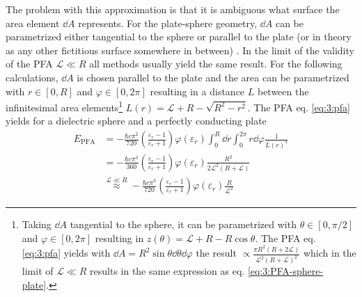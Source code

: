 The problem with this approximation is that it is ambiguous what surface the area element $\dd A$ represents. For the plate-sphere geometry, $\dd A$ can be parametrized either tangential to the sphere or parallel to the plate (or in theory as any other fictitious surface somewhere in between) \cite{Bulgac_2006}.
In the limit of the validity of the PFA $\mathscr{L} \ll R$ all methods usually yield the same result.
For the following calculations, $\dd A$ is chosen parallel to the plate and the area can be parametrized with $r\in [0, R]$ and $\varphi \in [0, 2\pi]$ resulting in a distance $L$ between the infinitesimal area elements\footnote{Taking $\dd A$ tangential to the sphere, it can be parametrized with $\theta \in [0, \pi/2]$ and $\varphi \in [0, 2\pi]$ resulting in $z(\theta) = \mathscr{L} + R - R\cos\theta$. The PFA eq. \eqref{eq:3:pfa} yields with $\dd A = R^2\sin\theta\dd\theta\dd\varphi$ the result $\propto \frac{\pi R^2(R + 2\mathscr{L})}{\mathscr{L}^2(R+\mathscr{L})^2}$ which in the limit of $\mathscr{L} \ll R$ results in the same expression as eq. \eqref{eq:3:PFA-sphere-plate}.} $L(r) = \mathscr{L} + R - \sqrt{R^2 - r^2}$. The PFA eq. \eqref{eq:3:pfa} yields for a dielectric sphere and a perfectly conducting plate
\begin{align}
  E_\mathrm{PFA} &= -\frac{\hbar c \pi^2}{720} \left(\frac{\varepsilon_r - 1}{\varepsilon_r + 1}\right) \varphi(\varepsilon_r) \int_0^R \dd r \int_0^{2\pi} r\dd \varphi \frac{1}{L(r)^3} \\
  &= -\frac{\hbar c \pi^3}{360} \left(\frac{\varepsilon_r - 1}{\varepsilon_r + 1}\right) \varphi(\varepsilon_r) \frac{R^2}{2\mathscr{L}^2(R + \mathscr{L})} \\
  &\overset{\mathscr{L}\ll R}{\approx} -\frac{\hbar c \pi^3}{720} \left(\frac{\varepsilon_r - 1}{\varepsilon_r + 1}\right) \varphi(\varepsilon_r) \frac{R}{\mathscr{L}^2} \label{eq:3:PFA-sphere-plate}
\end{align}

